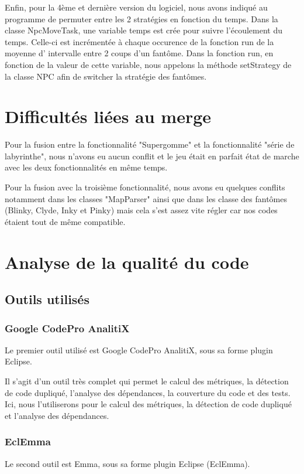 \documentclass[a4paper,12pt]{report} %
\begin{document}
Enfin, pour la 4ème et dernière version du logiciel, nous avons indiqué au programme de permuter entre les 2 stratégies en fonction du temps.
Dans la classe NpcMoveTask, une variable temps est crée pour suivre l'écoulement du temps. Celle-ci est incrémentée à chaque occurence de la fonction run de la moyenne d' intervalle entre 2 coups d'un fantôme. 
Dans la fonction run, en fonction de la valeur de cette variable, nous appelons la méthode setStrategy de la classe NPC afin de switcher la stratégie des fantômes.

\section{Difficultés liées au merge}
Pour la fusion entre la fonctionnalité "Supergomme" et la fonctionnalité "série de labyrinthe", nous n'avons eu aucun conflit et le jeu était en parfait état de marche avec les deux fonctionnalités en même temps.

Pour la fusion avec la troisième fonctionnalité, nous avons eu quelques conflits notamment dans les classes "MapParser" ainsi que dans les classe des fantômes (Blinky, Clyde, Inky et Pinky) mais cela s'est assez vite régler car nos codes étaient tout de même compatible.

\section{Analyse de la qualité du code}
\subsection{Outils utilisés}
\subsubsection{Google CodePro AnalitiX}
Le premier outil utilisé est Google CodePro AnalitiX, sous sa forme
plugin Eclipse.

Il s'agit d'un outil très complet qui permet le calcul des métriques,
la détection de code dupliqué, l'analyse des dépendances, la couverture
du code et des tests. Ici, nous l'utiliserons pour le calcul des métriques,
la détection de code dupliqué et l'analyse des dépendances.

\subsubsection{EclEmma}
Le second outil est Emma, sous sa forme plugin Eclipse (EclEmma).
\end{document}
